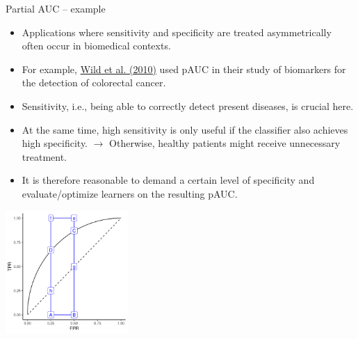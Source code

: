 
\begin{vbframe}{Partial AUC -- example}

\begin{itemize}
  \footnotesize
  \item Applications where sensitivity and specificity are treated
  asymmetrically often occur in biomedical contexts.
  \item For example,
  \href{https://clincancerres.aacrjournals.org/content/16/24/6111}
  {Wild et al. (2010)} used pAUC in their study of biomarkers for the detection
  of colorectal cancer.
  \item Sensitivity, i.e., being able to correctly detect present diseases, is
  crucial here.
  \item At the same time, high sensitivity is only useful if the classifier also
  achieves high specificity.
  $\rightarrow$ Otherwise, healthy patients might receive
  unnecessary treatment.
  \item It is therefore reasonable to demand a certain level of specificity and
  evaluate/optimize learners on the resulting pAUC.
\end{itemize}

\vfill
\includegraphics[width=0.35\textwidth]{figure/fig_pauc}

\end{vbframe}


